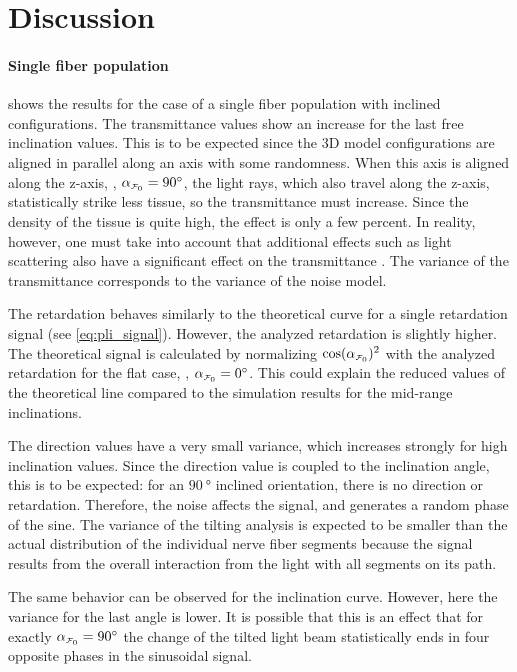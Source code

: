 \section{Discussion}
%
\paragraph{Single fiber population}
 shows the results for the case of a single fiber population with inclined configurations.
The transmittance values show an increase for the last free inclination values.
This is to be expected since the 3D model configurations are aligned in parallel along an axis with some randomness.
When this axis is aligned along the z-axis, \ie{}, $\modelInc=\SI{90}{\degree}$, the light rays, which also travel along the z-axis, statistically strike less tissue, so the transmittance must increase.
Since the density of the tissue is quite high, the effect is only a few percent.
In reality, however, one must take into account that additional effects such as light scattering also have a significant effect on the transmittance \cite{Menzel2021}.
The variance of the transmittance corresponds to the variance of the noise model.
\par
%
The retardation behaves similarly to the theoretical curve for a single retardation signal (see \cref{eq:pli_signal}).
However, the analyzed retardation is slightly higher.
The theoretical signal is calculated by normalizing $\cos(\modelInc)^2$ with the analyzed retardation for the flat case, \ie{}, $\modelInc = \SI{0}{\degree}$.
This could explain the reduced values of the theoretical line compared to the simulation results for the mid-range inclinations.
\par
%
The direction values have a very small variance, which increases strongly for high inclination values.
Since the direction value is coupled to the inclination angle, this is to be expected: for an $\SI{90}{\degree}$ inclined orientation, there is no direction or retardation.
Therefore, the noise affects the signal, and generates a random phase of the sine.
The variance of the tilting analysis is expected to be smaller than the actual distribution of the individual nerve fiber segments because the signal results from the overall interaction from the light with all segments on its path.
\par
%
The same behavior can be observed for the inclination curve.
However, here the variance for the last angle is lower.
It is possible that this is an effect that for exactly $\modelInc=\SI{90}{\degree}$ the change of the tilted light beam statistically ends in four opposite phases in the sinusoidal signal.
